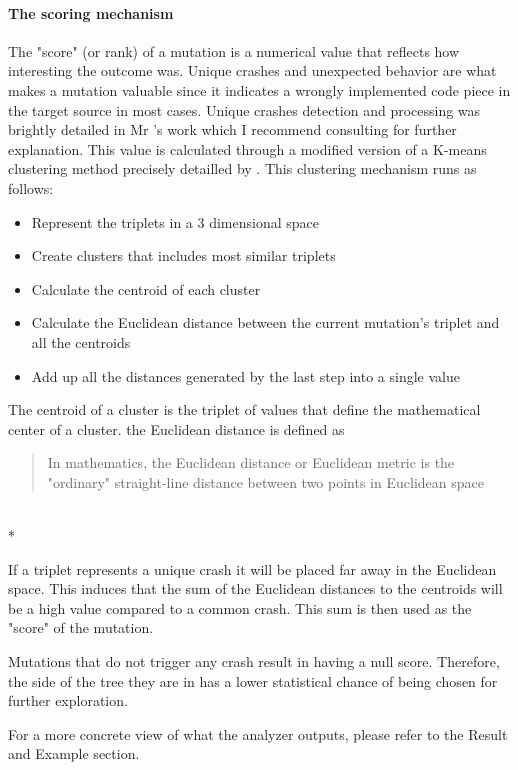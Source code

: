 \documentclass{article}
\begin{document}
\begin{empfile}
				\paragraph{The scoring mechanism}
The "score" (or rank) of a mutation is a numerical value that reflects how interesting the outcome was. Unique crashes and unexpected behavior are what makes a mutation valuable since it indicates a wrongly implemented code piece in the target source in most cases. Unique crashes detection and processing was brightly detailed in Mr \cite{Unique}'s work which I recommend consulting for further explanation. This value is calculated through a modified version of a K-means clustering method precisely detailled by \cite{Kmeans}.
This clustering mechanism runs as follows:
	\begin{itemize}
	\item{Represent the triplets in a 3 dimensional space}
	\item{Create clusters that includes most similar triplets}
	\item{Calculate the centroid of each cluster}
	\item{Calculate the Euclidean distance between the current mutation's triplet and all the centroids}
	\item{Add up all the distances generated by the last step into a single value}
	\end{itemize}

The centroid of a cluster is the triplet of values that define the mathematical center of a cluster.
the Euclidean distance is defined as
	\begin{quotation}
	In mathematics, the Euclidean distance or Euclidean metric is the "ordinary" straight-line distance between two points in Euclidean space
	\end{quotation}\cite{EuclideanDistance} \\*
	
If a triplet represents a unique crash it will be placed far away in the Euclidean space. This induces that the sum of the Euclidean distances to the centroids will be a high value compared to a common crash. This sum is then used as the "score" of the mutation. 

Mutations that do not trigger any crash result in having a null score. Therefore, the side of the tree they are in has a lower statistical chance of being chosen for further exploration.

For a more concrete view of what the analyzer outputs, please refer to the Result and Example section.


\end{empfile}
\end{document}
